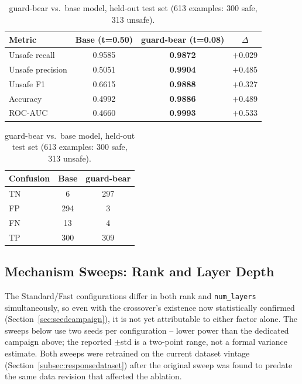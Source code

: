 \documentclass[pdflatex,sn-mathphys-num]{sn-jnl}%
\begin{document}
\begin{table}[!h]
  \centering
  \caption{guard-bear vs.\ base model, held-out test set (613 examples: 300 safe, 313 unsafe).}
  \label{tab:guardheadline}
  \small
  \begin{tabular}{@{}lccc@{}}
    \toprule
    Metric & Base (t=0.50) & guard-bear (t=0.08) & $\Delta$ \\
    \midrule
    Unsafe recall    & 0.9585 & \textbf{0.9872} & $+$0.029 \\
    Unsafe precision & 0.5051 & \textbf{0.9904} & $+$0.485 \\
    Unsafe F1        & 0.6615 & \textbf{0.9888} & $+$0.327 \\
    Accuracy         & 0.4992 & \textbf{0.9886} & $+$0.489 \\
    ROC-AUC          & 0.4660 & \textbf{0.9993} & $+$0.533 \\
    \bottomrule
  \end{tabular}
  \qquad
  \begin{tabular}{@{}lcc@{}}
    \toprule
    Confusion & Base & guard-bear \\
    \midrule
    TN & 6   & 297 \\
    FP & 294 & 3   \\
    FN & 13  & 4   \\
    TP & 300 & 309 \\
    \bottomrule
  \end{tabular}
\end{table}

\subsection{Mechanism Sweeps: Rank and Layer Depth}\label{sec:ranksweep}

The Standard/Fast configurations differ in both rank and \texttt{num\_layers} simultaneously, so even with the crossover's existence now statistically confirmed (Section~\ref{sec:seedcampaign}), it is not yet attributable to either factor alone. The sweeps below use two seeds per configuration -- lower power than the dedicated campaign above; the reported $\pm$std is a two-point range, not a formal variance estimate. Both sweeps were retrained on the current dataset vintage (Section~\ref{subsec:responsedataset}) after the original sweep was found to predate the same data revision that affected the ablation.
\end{document}
